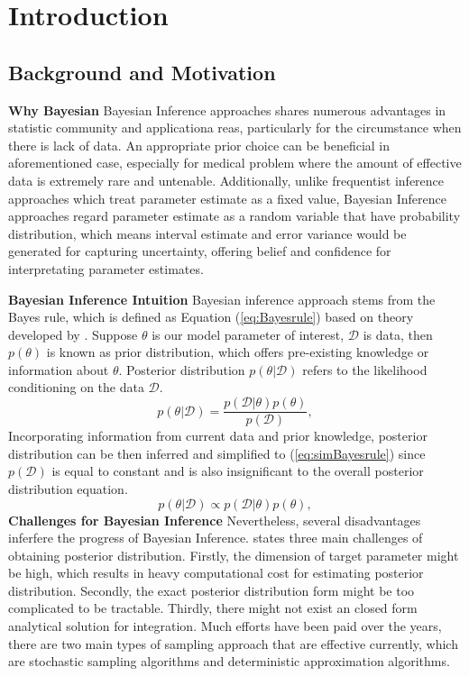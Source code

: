 \chapter{Introduction}
\label{Chapter1}
\section{Background and Motivation}
\textbf{Why Bayesian}
Bayesian Inference approaches shares numerous advantages in statistic community and applicationa reas, particularly for the circumstance when there is lack of data. An appropriate prior choice can be beneficial in aforementioned case, especially for medical problem where the amount of effective data is extremely rare and untenable. Additionally, unlike frequentist inference approaches which treat parameter estimate as a fixed value, Bayesian Inference approaches regard parameter estimate as a random variable that have probability distribution, which means interval estimate and error variance would be generated for capturing uncertainty, offering  belief and confidence for interpretating parameter estimates.

\textbf{Bayesian Inference Intuition}
 Bayesian inference approach stems from the Bayes rule, which is defined as Equation (\ref{eq:Bayesrule}) based on theory developed by \cite{Beech1959}. Suppose $\theta$ is our model parameter of interest, $\mathcal{D}$ is data, then $p(\theta)$ is known as prior distribution, which offers pre-existing knowledge or information about $\theta$. Posterior distribution $p(\theta|\mathcal{D})$ refers to the likelihood conditioning on the data $\mathcal{D}$.
\begin{equation}
	p(\theta|\mathcal{D}) = \frac{p(\mathcal{D}|\theta)p(\theta)}{p(\mathcal{D})},
	\label{eq:Bayesrule}
\end{equation}
Incorporating information from current data and prior knowledge, posterior distribution can be then inferred and simplified to (\ref{eq:simBayesrule}) since $p(\mathcal{D})$ is equal to constant and is also insignificant to the overall posterior distribution equation.
\begin{equation}
	p(\theta|\mathcal{D}) \propto p(\mathcal{D}|\theta)p(\theta),
	\label{eq:simBayesrule}
\end{equation}
\textbf{Challenges for Bayesian Inference}
Nevertheless, several disadvantages inferfere the progress of Bayesian Inference. \cite{bishop_2006} states three main challenges of obtaining posterior distribution. Firstly, the dimension of target parameter might be high, which results in heavy computational cost for estimating posterior distribution. Secondly, the exact posterior distribution form might be too complicated to be tractable. Thirdly, there might not exist an closed form analytical solution for integration. Much efforts have been paid over the years, there are two main types of sampling approach that are effective currently, which are stochastic sampling algorithms and deterministic approximation algorithms. 

